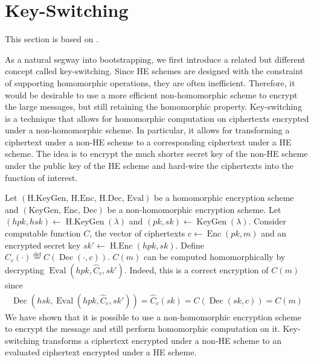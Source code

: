 \section{Key-Switching}
This section is based on \cite{Bra18-survey}.

As a natural segway into bootstrapping, we first introduce a related but different concept called key-switching. Since HE schemes are designed with the constraint of supporting homomorphic operations, they are often inefficient. Therefore, it would be desirable to use a more efficient non-homomorphic scheme to encrypt the large messages, but still retaining the homomorphic property. Key-switching is a technique that allows for homomorphic computation on ciphertexts encrypted under a non-homomorphic scheme. In particular, it allows for transforming a ciphertext under a non-HE scheme to a corresponding ciphertext under a HE scheme. The idea is to encrypt the much shorter secret key of the non-HE scheme under the public key of the HE scheme and hard-wire the ciphertexts into the function of interest.

Let $(\text{H.KeyGen, H.Enc, H.Dec, Eval})$ be a homomorphic encryption scheme and $(\text{KeyGen, Enc, Dec})$ be a non-homomorphic encryption scheme. Let $(hpk,hsk) \leftarrow \operatorname{H.KeyGen}(\lambda)$ and $(pk,sk) \leftarrow \operatorname{KeyGen}(\lambda)$. Consider computable function $C$, the vector of ciphertexts $c \leftarrow \operatorname{Enc}(pk,m)$ and an encrypted secret key $sk' \leftarrow \operatorname{H.Enc}(hpk,sk)$. Define $\hat{C}_c(\cdot) \stackrel{\mathrm{def}}{=} C(\operatorname{Dec}(\cdot, c))$. $C(m)$ can be computed homomorphically by decrypting $\operatorname{Eval}(hpk,\hat{C}_c, sk')$. Indeed, this is a correct encryption of $C(m)$ since
\begin{equation*}
    \begin{aligned}
        \operatorname{Dec}(hsk,\operatorname{Eval}(hpk,\hat{C}_c, sk')) = \hat{C}_c(sk) = C(\operatorname{Dec}(sk, c)) = C(m)
    \end{aligned}
\end{equation*}
We have shown that it is possible to use a non-homomorphic encryption scheme to encrypt the message and still perform homomorphic computation on it. Key-switching transforms a ciphertext encrypted under a non-HE scheme to an evaluated ciphertext encrypted under a HE scheme.

